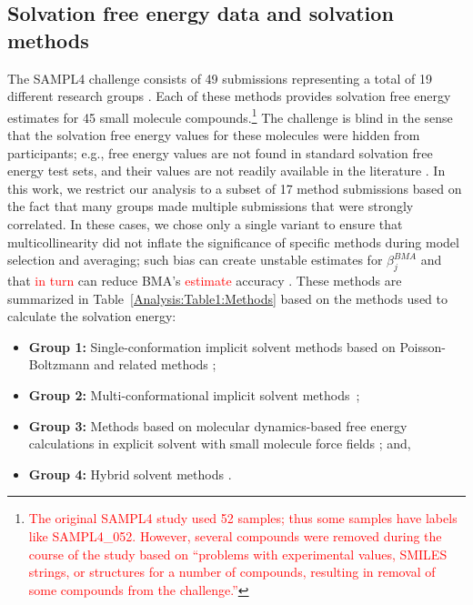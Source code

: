 \documentclass[journal=jpcbfk, manuscript=article]{achemso}
\newcommand{\+}[1]{\ensuremath{\mathbf{#1}}}
\newcommand{\rev}[1]{\textsf{\textcolor{red}{#1}}}
\begin{document}
\subsection{Solvation free energy data and solvation methods} \label{EP:DataModels}
The SAMPL4 challenge consists of 49 submissions representing a total of 19 different research groups \cite{Mobley:2014}.
Each of these methods provides solvation free energy estimates for 45 small molecule compounds.\footnote{\rev{The original SAMPL4 study used 52 samples; thus some samples have labels like SAMPL4\_052.
However, several compounds were removed during the course of the study based on ``problems with experimental values, SMILES strings, or structures for a number of compounds, resulting in removal of some compounds from the challenge.''\cite{Mobley:2014}}}
The challenge is blind in the sense that the solvation free energy values for these molecules were hidden from participants; e.g., free energy values are not found in standard solvation free energy test sets, and their values are not readily available in the literature \cite{Guthrie:2014}. 
In this work, we restrict our analysis to a subset of 17 method submissions based on the fact that many groups made multiple submissions that were strongly correlated.
In these cases, we chose only a single variant to ensure that multicollinearity did not inflate the significance of specific methods during model selection and averaging; such bias can create unstable estimates for $\beta^{BMA}_j$ and that \rev{in turn} can reduce BMA's \rev{estimate} accuracy \cite{Clyde:1999}.
These methods are summarized in Table~\ref{Analysis:Table1:Methods} based on the methods used to calculate the solvation energy: 
\begin{itemize} 
	\item \textbf{Group 1:} Single-conformation implicit solvent methods \cite{Ellingson:2014, Nicholl:2010, Hawkins} based on Poisson-Boltzmann and related methods \cite{Fixman:1979, Honig:1995, Davis:1990};
	\item \textbf{Group 2:} Multi-conformational implicit solvent methods~\cite{Sandberg:2013, Klamt:2009, Hogues:2014, Sulea:2011, Reinisch:2014}; 
	\item \textbf{Group 3:} Methods based on molecular dynamics-based free energy calculations in explicit solvent \cite{Klimovich:2010,Muddana:2014,Mobley:2009c,Mobley:2007} with small molecule force fields \cite{Wang:2004B};  and, 
	\item \textbf{Group 4:} Hybrid solvent methods \cite{Li:2014}.
\end{itemize}
\end{document}
